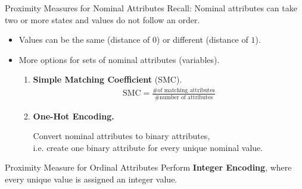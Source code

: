 \begin{frame}{Proximity Measures for Nominal Attributes}
	Recall: Nominal attributes can take two or more states and values do not follow an order.
	\begin{itemize}
		\item Values can be the same (distance of $0$) or different (distance of $1$).
		\item More options for sets of nominal attributes (variables).
		      \begin{enumerate}
			      \item \textbf{Simple Matching Coefficient} (SMC).
			            \begin{align*}
				            \text{SMC} = \frac{\# \text{of matching attributes}}{\# \text{number of attributes}}
			            \end{align*}
			      \item \textbf{One-Hot Encoding.}

			            Convert nominal attributes to binary attributes,\\ i.e. create one
			            binary attribute for every unique nominal value.
		      \end{enumerate}
	\end{itemize}

	\vspace*{1em}
	\begin{block}{Proximity Measure for Ordinal Attributes}
		Perform \textbf{Integer Encoding}, where every unique value is assigned an integer value.
	\end{block}
\end{frame}

